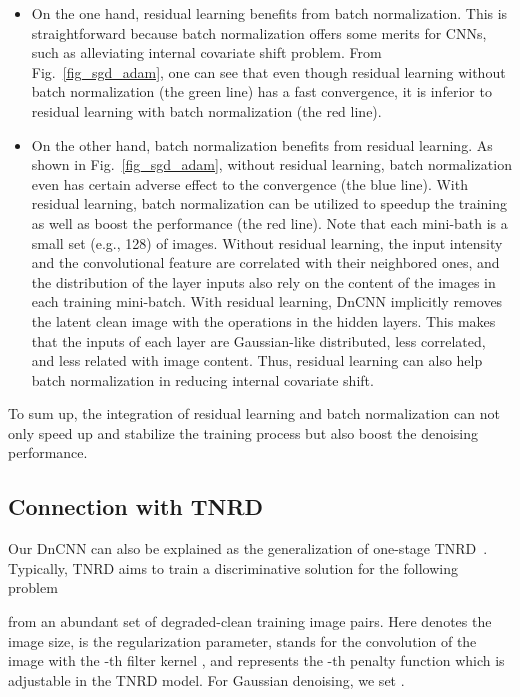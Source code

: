 \documentclass[journal]{IEEEtran}
\begin{document}
\begin{itemize}
\item On the one hand, residual learning benefits from batch normalization. This is straightforward because batch normalization offers some merits for CNNs, such as alleviating internal covariate shift problem. From Fig.~\ref{fig_sgd_adam}, one can see that even though residual learning without batch normalization (the green line) has a fast convergence, it is inferior to residual learning with batch normalization (the red line).
\item On the other hand, batch normalization benefits from residual learning. As shown in Fig.~\ref{fig_sgd_adam}, without residual learning, batch normalization even has certain adverse effect to the convergence (the blue line). With residual learning, batch normalization can be utilized to speedup the training as well as boost the performance (the red line). Note that each mini-bath is a small set (e.g., 128) of images. Without residual learning, the input intensity and the convolutional feature are correlated with their neighbored ones, and the distribution of the layer inputs also rely on the content of the images in each training mini-batch. With residual learning, DnCNN implicitly removes the latent clean image with the operations in the hidden layers. This makes that the inputs of each layer are Gaussian-like distributed, less correlated, and less related with image content. Thus, residual learning can also help batch normalization in reducing internal covariate shift.

\end{itemize}




To sum up, the integration of residual learning and batch normalization can not only speed up and stabilize the training process but also boost the denoising performance.



\subsection{Connection with TNRD} \label{sec:tnrd}
Our DnCNN can also be explained as the generalization of one-stage TNRD~\cite{chen2015learning,chen2015trainable}. Typically, TNRD aims to train a discriminative solution for the following problem

from an abundant set of degraded-clean training  image pairs. Here  denotes the image size,  is the regularization parameter,  stands for the convolution of the image  with the -th filter kernel , and  represents the -th penalty function which is adjustable in the TNRD model. For Gaussian denoising, we set .
\end{document}
